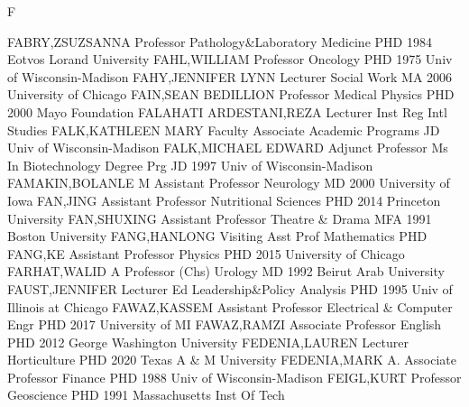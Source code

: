 \documentclass[
]{article}
\begin{document}
F

\textbar{}

FABRY,ZSUZSANNA \textbar Professor \textbar Pathology\&Laboratory
Medicine \textbar{}  \textbar PHD 1984 Eotvos Lorand
University \textbar FAHL,WILLIAM \textbar Professor \textbar Oncology
\textbar{}  \textbar PHD 1975 Univ of Wisconsin-Madison
\textbar FAHY,JENNIFER LYNN \textbar Lecturer \textbar Social Work
\textbar{}  \textbar MA 2006 University of Chicago
\textbar FAIN,SEAN BEDILLION \textbar Professor \textbar Medical Physics
\textbar{}  \textbar PHD 2000 Mayo Foundation
\textbar FALAHATI ARDESTANI,REZA \textbar Lecturer \textbar Inst Reg
Intl Studies \textbar{}  \textbar FALK,KATHLEEN MARY
\textbar Faculty Associate \textbar Academic Programs \textbar JD Univ
of Wisconsin-Madison \textbar{}  \textbar FALK,MICHAEL EDWARD
\textbar Adjunct Professor \textbar Ms In Biotechnology Degree Prg
\textbar JD 1997 Univ of Wisconsin-Madison \textbar{} 
\textbar FAMAKIN,BOLANLE M \textbar Assistant Professor
\textbar Neurology \textbar MD 2000 University of Iowa \textbar{}
 \textbar FAN,JING \textbar Assistant Professor
\textbar Nutritional Sciences \textbar PHD 2014 Princeton University
\textbar{}  \textbar FAN,SHUXING \textbar Assistant Professor
\textbar Theatre \& Drama \textbar MFA 1991 Boston University \textbar{}
 \textbar FANG,HANLONG \textbar Visiting Asst Prof
\textbar Mathematics \textbar PHD \textbar{} 
\textbar FANG,KE \textbar Assistant Professor \textbar Physics
\textbar PHD 2015 University of Chicago \textbar{} 
\textbar FARHAT,WALID A \textbar Professor (Chs) \textbar Urology
\textbar MD 1992 Beirut Arab University \textbar{} 
\textbar FAUST,JENNIFER \textbar Lecturer \textbar Ed Leadership\&Policy
Analysis \textbar PHD 1995 Univ of Illinois at Chicago \textbar{}
 \textbar FAWAZ,KASSEM \textbar Assistant Professor
\textbar Electrical \& Computer Engr \textbar PHD 2017 University of MI
\textbar{}  \textbar FAWAZ,RAMZI \textbar Associate Professor
\textbar English \textbar PHD 2012 George Washington University
\textbar{}  \textbar FEDENIA,LAUREN \textbar Lecturer
\textbar Horticulture \textbar PHD 2020 Texas A \& M University
\textbar{}  \textbar FEDENIA,MARK A. \textbar Associate
Professor \textbar Finance \textbar PHD 1988 Univ of Wisconsin-Madison
\textbar{}  \textbar FEIGL,KURT \textbar Professor
\textbar Geoscience \textbar PHD 1991 Massachusetts Inst Of Tech
\end{document}
